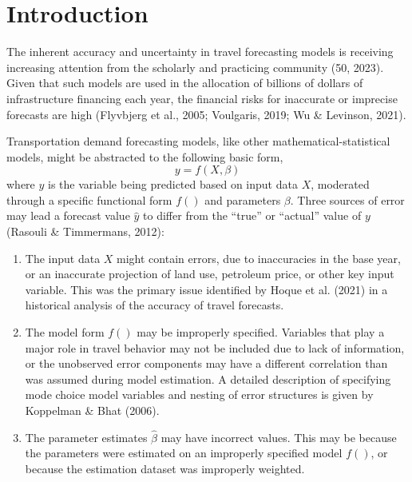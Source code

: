 \documentclass[fancy, masters, twoside]{byuthesis}
\begin{document}
	\tableofcontents
	\cleardoublepage

	\listoffigures
	\cleardoublepage

	\listoftables
	\cleardoublepage

	
	\cleardoublepage

	\mainmatter

\hypertarget{introduction}{%
\chapter{Introduction}\label{introduction}}

The inherent accuracy and uncertainty in travel forecasting models is receiving increasing attention from the scholarly and practicing community (50, 2023). Given that such models are used in the allocation of billions of dollars of infrastructure financing each year, the financial risks for inaccurate or imprecise forecasts are high (Flyvbjerg et al., 2005; Voulgaris, 2019; Wu \& Levinson, 2021).

Transportation demand forecasting models, like other mathematical-statistical models, might be abstracted to the following basic form,
\begin{equation}
y = f(X, \beta)
\end{equation}
where \(y\) is the variable being predicted based on input data \(X\), moderated through a specific functional form \(f()\) and parameters \(\beta\). Three sources of error may lead a forecast value \(\hat{y}\) to differ from the ``true'' or ``actual'' value of \(y\) (Rasouli \& Timmermans, 2012):

\begin{enumerate}
\def\labelenumi{\arabic{enumi}.}
\item
  The input data \(X\) might contain errors, due to inaccuracies in the base year, or an inaccurate projection of land use, petroleum price, or other key input variable. This was the primary issue identified by Hoque et al. (2021) in a historical analysis of the accuracy of travel forecasts.
\item
  The model form \(f()\) may be improperly specified. Variables that play a major role in travel behavior may not be included due to lack of information, or the unobserved error components may have a different correlation than was assumed during model estimation. A detailed description of specifying mode choice model variables and nesting of error structures is given by Koppelman \& Bhat (2006).
\item
  The parameter estimates \(\hat{\beta}\) may have incorrect values. This may be because the parameters were estimated on an improperly specified model \(f()\), or because the estimation dataset was improperly weighted.
\end{enumerate}
\end{document}

